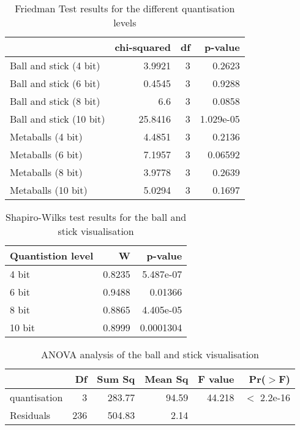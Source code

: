 \begin{table}
  \begin{tabular}{ | l | r | r | r | }
  \hline
                          & chi-squared & df &    p-value  \\ \hline
  Ball and stick (4 bit)  &      3.9921 &  3 &     0.2623  \\ \hline
  Ball and stick (6 bit)  &      0.4545 &  3 &     0.9288  \\ \hline
  Ball and stick (8 bit)  &         6.6 &  3 &     0.0858  \\ \hline
  Ball and stick (10 bit) &     25.8416 &  3 &  1.029e-05  \\ \hline
  Metaballs (4 bit)       &      4.4851 &  3 &     0.2136  \\ \hline
  Metaballs (6 bit)       &      7.1957 &  3 &    0.06592  \\ \hline
  Metaballs (8 bit)       &      3.9778 &  3 &     0.2639  \\ \hline
  Metaballs (10 bit)      &      5.0294 &  3 &     0.1697  \\ \hline
  \end{tabular}
  \caption{Friedman Test results for the different quantisation levels}
  \label{tab:appendix_dataset_friedman}
\end{table}


\begin{table}
  \begin{tabular}{ | l | r | r | }
  \hline
  Quantistion level &      W &   p-value  \\ \hline
  4 bit             & 0.8235 & 5.487e-07  \\ \hline
  6 bit             & 0.9488 &   0.01366  \\ \hline
  8 bit             & 0.8865 & 4.405e-05  \\ \hline
  10 bit            & 0.8999 & 0.0001304  \\ \hline
  \end{tabular}
  \caption{Shapiro-Wilks test results for the ball and stick visualisation}
  \label{tab:appendix_ballstick_normality}
\end{table}


\begin{table}
  \begin{tabular}{ | l | r | r | r | r | r | }
  \hline
               &  Df & Sum Sq & Mean Sq & F value &   Pr($>$F)   \\ \hline
  quantisation &   3 & 283.77 &   94.59 &  44.218 & $<$ 2.2e-16  \\ \hline
  Residuals    & 236 & 504.83 &    2.14 &         &              \\ \hline
  \end{tabular}
  \caption{ANOVA analysis of the ball and stick visualisation}
  \label{tab:appendix_ballstick_anova}
\end{table}



